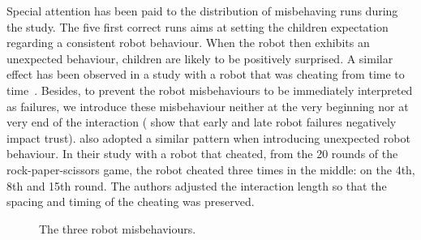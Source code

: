 \documentclass{sig-alternate}
\begin{document}
Special attention has been paid to the distribution of misbehaving runs during
the study. The five first correct runs aims at setting the children expectation
regarding a consistent robot behaviour. When the robot then exhibits an
unexpected behaviour, children are likely to be positively surprised. A similar
effect has been observed in a study with a robot that was cheating from time to
time~\cite{short_no_2010}.  Besides, to prevent the robot misbehaviours to be
immediately interpreted as failures, we introduce these misbehaviour neither at
the very beginning nor at very end of the interaction
(\cite{desai_effects_2012,desai_impact_2013} show that early and late robot
failures negatively impact trust). \cite{short_no_2010} also adopted a similar
pattern when introducing unexpected robot behaviour. In their study with a robot
that cheated, from the 20 rounds of the rock-paper-scissors game, the robot
cheated three times in the middle: on the 4th, 8th and 15th round. The authors
adjusted the interaction length so that the spacing and timing of the cheating
was preserved.

\begin{figure}[!t]
    \centering
    \caption{\small The three robot misbehaviours.}
    \label{fig:domino-misbehaviour}
\end{figure}
\end{document}
